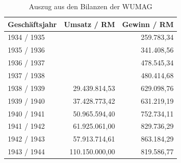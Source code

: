 
\begin{table}
\centering
\begin{tabularx}{.6\textwidth}{Xrr}
\hline
\textbf{Geschäftsjahr} & \textbf{Umsatz / RM} & \textbf{Gewinn / RM}\\
\hline
1934 / 1935 & & 259.783,34\\
1935 / 1936 & & 341.408,56\\
1936 / 1937 & & 478.545,34\\
1937 / 1938 & & 480.414,68\\
1938 / 1939 & 29.439.814,53 & 629.098,76\\
1939 / 1940 & 37.428.773,42 & 631.219,19\\
1940 / 1941 & 50.965.594,40 & 752.734,11\\
1941 / 1942 & 61.925.061,00 & 829.736,29\\
1942 / 1943 & 57.913.714,61 & 863.184,29\\
1943 / 1944 & 110.150.000,00 & 819.586,77\\
\hline
\end{tabularx}
\caption{Auszug aus den Bilanzen der WUMAG\label{umsaetze}}
\end{table}



